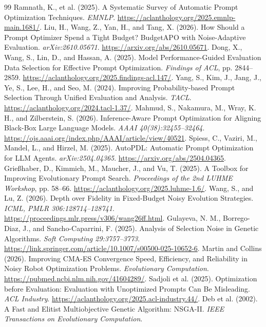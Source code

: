 \documentclass{article}
\begin{document}
\begin{thebibliography}{99}
 Ramnath, K., et al. (2025). A Systematic Survey of Automatic Prompt Optimization Techniques. \emph{EMNLP}. \url{https://aclanthology.org/2025.emnlp-main.1681/}.
 Liu, H., Wang, Z., Yan, H., and Tang, X. (2026). How Should a Prompt Optimizer Spend a Tight Budget? BudgetAPO with Noise-Adaptive Evaluation. \emph{arXiv:2610.05671}. \url{https://arxiv.org/abs/2610.05671}.
 Dong, X., Wang, S., Lin, D., and Hassan, A. (2025). Model Performance-Guided Evaluation Data Selection for Effective Prompt Optimization. \emph{Findings of ACL}, pp. 2844--2859. \url{https://aclanthology.org/2025.findings-acl.147/}.
 Yang, S., Kim, J., Jang, J., Ye, S., Lee, H., and Seo, M. (2024). Improving Probability-based Prompt Selection Through Unified Evaluation and Analysis. \emph{TACL}. \url{https://aclanthology.org/2024.tacl-1.37/}.
 Mahmud, S., Nakamura, M., Wray, K. H., and Zilberstein, S. (2026). Inference-Aware Prompt Optimization for Aligning Black-Box Large Language Models. \emph{AAAI 40(38):32455--32464}. \url{https://ojs.aaai.org/index.php/AAAI/article/view/40521}.
 Spiess, C., Vaziri, M., Mandel, L., and Hirzel, M. (2025). AutoPDL: Automatic Prompt Optimization for LLM Agents. \emph{arXiv:2504.04365}. \url{https://arxiv.org/abs/2504.04365}.
 Grie{\ss}haber, D., Kimmich, M., Maucher, J., and Vu, T. (2025). A Toolbox for Improving Evolutionary Prompt Search. \emph{Proceedings of the 2nd LUHME Workshop}, pp. 58--66. \url{https://aclanthology.org/2025.luhme-1.6/}.
 Wang, S., and Lu, Z. (2026). Depth over Fidelity in Fixed-Budget Noisy Evolution Strategies. \emph{ICML, PMLR 306:128714--128741}. \url{https://proceedings.mlr.press/v306/wang26ff.html}.
 Gulayeva, N. M., Borrego-Diaz, J., and Sancho-Caparrini, F. (2025). Analysis of Selection Noise in Genetic Algorithms. \emph{Soft Computing 29:3757--3773}. \url{https://link.springer.com/article/10.1007/s00500-025-10652-6}.
 Martin and Collins (2026). Improving CMA-ES Convergence Speed, Efficiency, and Reliability in Noisy Robot Optimization Problems. \emph{Evolutionary Computation}. \url{https://pubmed.ncbi.nlm.nih.gov/41604289/}.
 Sadjoli et al. (2025). Optimization before Evaluation: Evaluation with Unoptimized Prompts Can Be Misleading. \emph{ACL Industry}. \url{https://aclanthology.org/2025.acl-industry.44/}.
 Deb et al. (2002). A Fast and Elitist Multiobjective Genetic Algorithm: NSGA-II. \emph{IEEE Transactions on Evolutionary Computation}.
\end{thebibliography}
\end{document}
